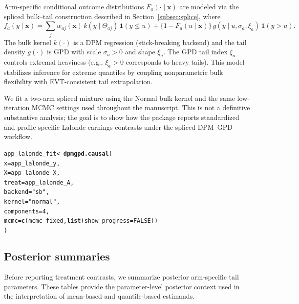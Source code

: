 \documentclass[article]{jss}\usepackage[]{graphicx}\usepackage[]{xcolor}
\makeatletter
\newcommand{\hlnum}[1]{\textcolor[rgb]{0.686,0.059,0.569}{#1}}%
\newcommand{\hlsng}[1]{\textcolor[rgb]{0.192,0.494,0.8}{#1}}%
\newcommand{\hldef}[1]{\textcolor[rgb]{0.345,0.345,0.345}{#1}}%
\newcommand{\hlkwb}[1]{\textcolor[rgb]{0.69,0.353,0.396}{#1}}%
\newcommand{\hlkwc}[1]{\textcolor[rgb]{0.333,0.667,0.333}{#1}}%
\newcommand{\hlkwd}[1]{\textcolor[rgb]{0.737,0.353,0.396}{\textbf{#1}}}%
\newenvironment{kframe}{%
 \def\at@end@of@kframe{}%
 \ifinner\ifhmode%
  \def\at@end@of@kframe{\end{minipage}}%
  \begin{minipage}{\columnwidth}%
 \fi\fi%
 \def\FrameCommand##1{\hskip\@totalleftmargin \hskip-\fboxsep
 \colorbox{shadecolor}{##1}\hskip-\fboxsep
     \hskip-\linewidth \hskip-\@totalleftmargin \hskip\columnwidth}%
 \MakeFramed {\advance\hsize-\width
   \@totalleftmargin\z@ \linewidth\hsize
   \@setminipage}}%
 {\par\unskip\endMakeFramed%
 \at@end@of@kframe}
\newenvironment{knitrout}{}{} %
\makeatother
\begin{document}
Arm-specific conditional outcome distributions
$F_a(\cdot\mid \boldsymbol{x})$ are modeled via the spliced bulk--tail
construction described in Section~\ref{subsec:splice}, where
\begin{equation*}
f_a(y\mid \boldsymbol{x})
=
\sum_j w_{aj}(\boldsymbol{x})\, k(y\mid \Theta_{aj})\,\mathbf{1}(y\le u)
+
\{1-F_a(u\mid \boldsymbol{x})\}\, g(y\mid u,\sigma_a,\xi_a)\,\mathbf{1}(y>u).
\end{equation*}
The bulk kernel $k(\cdot)$ is a DPM regression
(stick-breaking backend) and the tail density $g(\cdot)$ is GPD with
scale $\sigma_a>0$ and shape $\xi_a$. The GPD tail index $\xi_a$
controls extremal heaviness (e.g., $\xi_a>0$ corresponds to heavy
tails). This model stabilizes inference for extreme quantiles by
coupling nonparametric bulk flexibility with EVT-consistent tail
extrapolation.

We fit a two-arm spliced mixture using the Normal bulk kernel and the
same low-iteration MCMC settings used throughout the manuscript. This is
not a definitive substantive analysis; the goal is to show how the
package reports standardized and profile-specific Lalonde earnings
contrasts under the spliced DPM--GPD workflow.



\begin{knitrout}\footnotesize
{}\color{fgcolor}\begin{kframe}
\begin{alltt}
\hldef{app_lalonde_fit} \hlkwb{<-} \hlkwd{dpmgpd.causal}\hldef{(}
  \hlkwc{x} \hldef{= app_lalonde_y,}
  \hlkwc{X} \hldef{= app_lalonde_X,}
  \hlkwc{treat} \hldef{= app_lalonde_A,}
  \hlkwc{backend} \hldef{=} \hlsng{"sb"}\hldef{,}
  \hlkwc{kernel} \hldef{=} \hlsng{"normal"}\hldef{,}
  \hlkwc{components} \hldef{=} \hlnum{4}\hldef{,}
  \hlkwc{mcmc} \hldef{=} \hlkwd{c}\hldef{(mcmc_fixed,} \hlkwd{list}\hldef{(}\hlkwc{show_progress} \hldef{=} \hlnum{FALSE}\hldef{))}
\hldef{)}
\end{alltt}
\end{kframe}
\end{knitrout}



\subsection{Posterior summaries}

Before reporting treatment contrasts, we summarize posterior arm-specific
tail parameters. These tables provide the parameter-level posterior
context used in the interpretation of mean-based and quantile-based
estimands.
\end{document}
